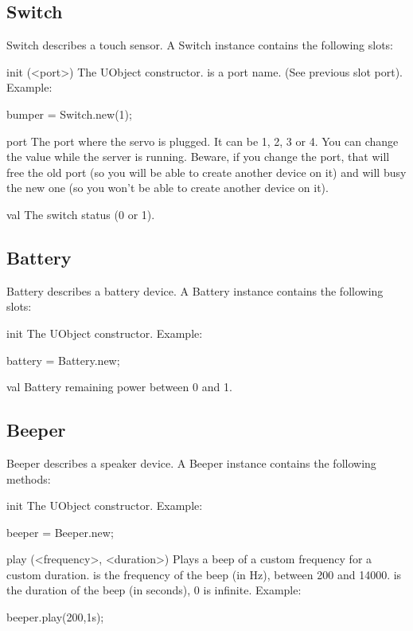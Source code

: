 \subsection{Switch}
Switch describes a touch sensor. A Switch instance contains the following
slots:

\begin{urbiscriptapi}
\item[init](<port>) The UObject constructor.  is a port name. (See
  previous slot port). Example:
\begin{urbiunchecked}
bumper = Switch.new(1);
\end{urbiunchecked}


\item[port] The port where the servo is plugged. It can be 1, 2, 3 or 4. You
  can change the value while the server is running. Beware, if you change
  the port, that will free the old port (so you will be able to create
  another device on it) and will busy the new one (so you won't be able to
  create another device on it).


\item[val] The switch status (0 or 1).
\end{urbiscriptapi}

\subsection{Battery}
Battery describes a battery device. A Battery instance contains the
following slots:
\begin{urbiscriptapi}
\item[init] The UObject constructor. Example:
\begin{urbiunchecked}
battery = Battery.new;
\end{urbiunchecked}


\item[val] Battery remaining power between 0 and 1.
\end{urbiscriptapi}

\subsection{Beeper}
Beeper describes a speaker device. A Beeper instance contains the following
methods:

\begin{urbiscriptapi}
\item[init] The UObject constructor.  Example:
\begin{urbiunchecked}
beeper = Beeper.new;
\end{urbiunchecked}


\item[play](<frequency>, <duration>) Plays a beep of a custom frequency for
  a custom duration.   is the frequency of the beep (in Hz),
  between 200 and 14000.   is the duration of the beep (in
  seconds), 0 is infinite.  Example:
\begin{urbiunchecked}
beeper.play(200,1s);
\end{urbiunchecked}
\end{urbiscriptapi}

